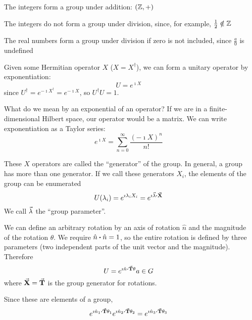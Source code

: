 \documentclass[a4paper,twoside,master.tex]{subfiles}
\begin{document}
\begin{ex}
    The integers form a group under addition: $ (\mathbb{Z}, +) $
\end{ex}
\begin{ex}
    The integers do not form a group under division, since, for example, $ \frac{1}{2} \notin \mathbb{Z} $
\end{ex}
\begin{ex}
    The real numbers form a group under division if zero is not included, since $ \frac{a}{0} $ is undefined
\end{ex}

Given some Hermitian operator $ X $ ($ X = X^\dagger $), we can form a unitary operator by exponentiation:
\begin{equation}
    U = e^{\imath X}
\end{equation}
since $ U^\dagger = e^{- \imath X^\dagger} = e^{- \imath X} $, so $ U^\dagger U = 1 $.

What do we mean by an exponential of an operator? If we are in a finite-dimensional Hilbert space, our operator would be a matrix. We can write exponentiation as a Taylor series:
\begin{equation}
    e^{\imath X} = \sum_{n=0}^{\infty} \frac{(- \imath X)^n}{n!}
\end{equation}

These $ X $ operators are called the ``generator'' of the group. In general, a group has more than one generator. If we call these generators $ X_i $, the elements of the group can be enumerated
\begin{equation}
    U(\lambda_i) = e^{\imath \lambda_i X_i} = e^{\imath \va{\lambda} \vdot\va{ X}}
\end{equation}
We call $ \va{\lambda} $ the ``group parameter''.

\begin{ex}
    We can define an arbitrary rotation by an axis of rotation $\hat{ n} $ and the magnitude of the rotation $ \theta $. We require $\hat{ n} \vdot\hat{ n} = 1 $, so the entire rotation is defined by three parameters (two independent parts of the unit vector and the magnitude). Therefore
    \begin{equation}
        U = e^{\imath\hat{ n} \vdot\va{T} \theta}a \in G
    \end{equation}
    where $\va{X} =\va{T} $ is the group generator for rotations.

    Since these are elements of a group,
    \begin{equation}
        e^{\imath\hat{ n}_1 \vdot\va{ T} \theta_1} e^{\imath\hat{ n}_2 \vdot\va{ T} \theta_2} = e^{\imath\hat{ n}_3 \vdot\va{ T} \theta_3}
    \end{equation}
\end{ex}
\end{document}
